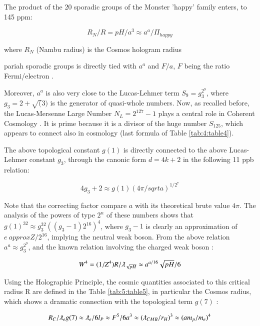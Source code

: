 \documentclass[a4paper,9pt]{article}
\begin{document}
The product of the 20 sporadic groups of the Monster 'happy' family enters, to 145 ppm:

\begin{equation}
 R_N/R = pH/a^3 \approx a^a /\Pi_{happy}
\end{equation}

where $R_N$ (Nambu radius) is the Cosmos hologram radius \cite {Sanchez}



pariah sporadic groups is directly tied with $a^a$ and $F/a$, $F$ being the ratio Fermi/electron \cite{Sanchez}. 

Moreover, $a^a$  is also very close to the Lucas-Lehmer term $S_9 = g_3^{2^9}$, where $ g_3 = 2 + \sqrt(3)$ is the generator of quasi-whole numbers. Now, as recalled before, the Lucas-Mersenne Large Number $N_L = 2^{127} - 1$ plays a central role in Coherent Cosmology \cite{Sanchez}. It is prime because it is a divisor of the huge number $S_{125}$, which appears to connect also in cosmology (last formula of Table \ref{tab:4:table4}).

The above topological constant $g(1)$ is directly connected to the above Lucas-Lehmer constant $g_3$, through the canonic form $d = 4k+2$ in the following 11 ppb relation:

\begin{equation}
4g_3 +2  \approx g(1) (4\pi/sqrt a)^{1/2^7} 
\end{equation}

Note that the correcting factor compare $a$ with its theoretical brute value $4\pi$. The analysis of the powers of type $2^n$ of these numbers shows that $g(1)^{32} \approx g_3^{32}((g_3 - 1) 2^{16})^4$, where $g_3 - 1$ is clearly an approximation of $e \ approx Z/2^{16}$, implying the neutral weak boson. From the above relation $ a^a \approx g_3^{2^9}$, and the known relation involving the charged weak boson \cite{Sanchez}:

\begin{equation}
W^4 = (1/Z^4)R/\lambdabar_{\sqrt{pH}} \approx a^{a/16} \sqrt{pH}/6  
\end{equation}

Using the Holographic Principle, the cosmic quantities associated to this critical radius R are defined in the Table \ref{tab:5:table5}, in particular the Cosmos radius, which shows a dramatic connection with the topological term $g(7)$ :

\begin{equation}
R_{C}/\lambdabar_{e} g(7) \approx  \lambdabar_{e}/6l_P \approx F^5/6a^3 \approx (\lambdabar_{CMB}/r_H)^3 \approx  (am_p/m_e)^4  
\end{equation}
\end{document}
